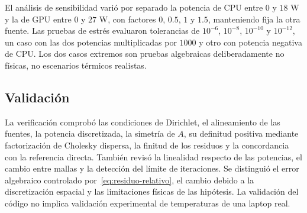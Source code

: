 El an\'alisis de sensibilidad vari\'o por separado la potencia de CPU entre $0$ y $18$ W y la de GPU entre $0$ y $27$ W, con factores $0$, $0.5$, $1$ y $1.5$, manteniendo fija la otra fuente. Las pruebas de estr\'es evaluaron tolerancias de $10^{-6}$, $10^{-8}$, $10^{-10}$ y $10^{-12}$, un caso con las dos potencias multiplicadas por $1000$ y otro con potencia negativa de CPU. Los dos casos extremos son pruebas algebraicas deliberadamente no f\'isicas, no escenarios t\'ermicos realistas.

\subsection{Validaci\'on}

La verificaci\'on comprob\'o las condiciones de Dirichlet, el alineamiento de las fuentes, la potencia discretizada, la simetr\'ia de $A$, su definitud positiva mediante factorizaci\'on de Cholesky dispersa, la finitud de los residuos y la concordancia con la referencia directa. Tambi\'en revis\'o la linealidad respecto de las potencias, el cambio entre mallas y la detecci\'on del l\'imite de iteraciones. Se distingui\'o el error algebraico controlado por~\eqref{eq:residuo-relativo}, el cambio debido a la discretizaci\'on espacial y las limitaciones f\'isicas de las hip\'otesis. La validaci\'on del c\'odigo no implica validaci\'on experimental de temperaturas de una laptop real.
